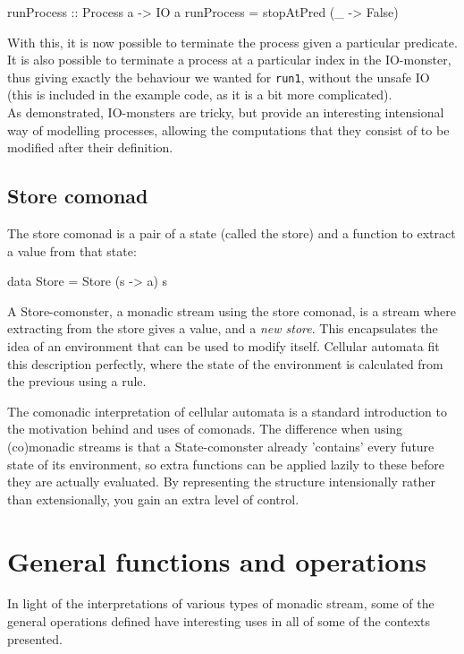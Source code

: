\documentclass{article}
\begin{document}
 \begin{haskell}
runProcess :: Process a -> IO a
runProcess = stopAtPred (\_ -> False)
\end{haskell}

With this, it is now possible to terminate the process given a particular predicate. It is also possible to terminate a process at a particular index in the IO-monster, thus giving exactly the behaviour we wanted for \verb+run1+, without the unsafe IO (this is included in the example code, as it is a bit more complicated). \\

As demonstrated, IO-monsters are tricky, but provide an interesting intensional way of modelling processes, allowing the computations that they consist of to be modified after their definition.
 
\subsection{Store comonad}

The store comonad is a pair of a state (called the store) and a function to extract a value from that state:

\begin{haskell}
data Store = Store (s -> a) s
\end{haskell}

A Store-comonster, a monadic stream using the store comonad, is a stream where extracting from the store gives a value, and a \emph{new store}. This encapsulates the idea of an environment that can be used to modify itself. Cellular automata fit this description perfectly, where the state of the environment is calculated from the previous using a rule. 

The comonadic interpretation of cellular automata is a standard introduction to the motivation behind and uses of comonads. The difference when using (co)monadic streams is that a State-comonster already 'contains' every future state of its environment, so extra functions can be applied lazily to these before they are actually evaluated. By representing the structure intensionally rather than extensionally, you gain an extra level of control.
 
\section{General functions and operations}

In light of the interpretations of various types of monadic stream, some of the general operations defined have interesting uses in all of some of the contexts presented. \\
\end{document}
